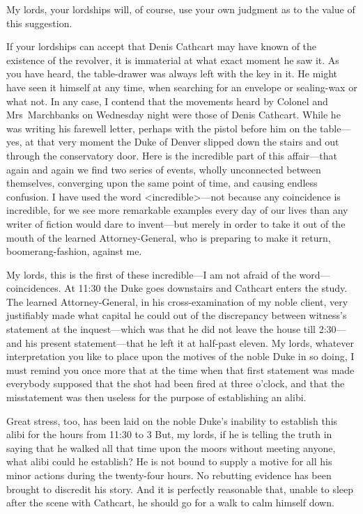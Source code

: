 \begin{dialogue}
  My lords, your lordships will, of course, use your own judgment as to the value of this suggestion.

 If your lordships can accept that Denis Cathcart may have known of the existence of the revolver, it is immaterial at what exact moment he saw it. As you have heard, the table-drawer was always left with the key in it. He might have seen it himself at any time, when searching for an envelope or sealing-wax or what not. In any case, I contend that the movements heard by Colonel and Mrs~Marchbanks on Wednesday night were those of Denis Cathcart. While he was writing his farewell letter, perhaps with the pistol before him on the table—yes, at that very moment the Duke of Denver slipped down the stairs and out through the conservatory door. Here is the incredible part of this affair—that again and again we find two series of events, wholly unconnected between themselves, converging upon the same point of time, and causing endless confusion. I have used the word <incredible>—not because any coincidence is incredible, for we see more remarkable examples every day of our lives than any writer of fiction would dare to invent—but merely in order to take it out of the mouth of the learned Attorney-General, who is preparing to make it return, boomerang-fashion, against me. 

 

My lords, this is the first of these incredible—I am not afraid of the word—coincidences. At 11:30 the Duke goes downstairs and Cathcart enters the study. The learned Attorney-General, in his cross-examination of my noble client, very justifiably made what capital he could out of the discrepancy between witness's statement at the inquest—which was that he did not leave the house till 2:30—and his present statement—that he left it at half-past eleven. My lords, whatever interpretation you like to place upon the motives of the noble Duke in so doing, I must remind you once more that at the time when that first statement was made everybody supposed that the shot had been fired at three o'clock, and that the misstatement was then useless for the purpose of establishing an alibi.



Great stress, too, has been laid on the noble Duke's inability to establish this alibi for the hours from 11:30 to 3  But, my lords, if he is telling the truth in saying that he walked all that time upon the moors without meeting anyone, what alibi could he establish? He is not bound to supply a motive for all his minor actions during the twenty-four hours. No rebutting evidence has been brought to discredit his story. And it is perfectly reasonable that, unable to sleep after the scene with Cathcart, he should go for a walk to calm himself down.




\end{dialogue}
